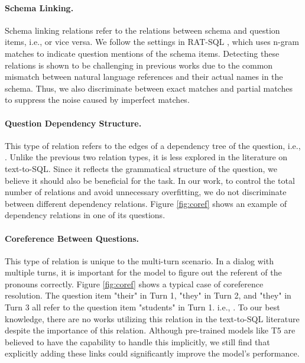 \documentclass[11pt]{article}
\begin{document}
\paragraph{Schema Linking.} Schema linking relations refer to the relations between schema and question items, i.e.,  or vice versa. We follow the settings in RAT-SQL \citep{wang-etal-2020-rat}, which uses n-gram matches to indicate question mentions of the schema items. Detecting these relations is shown to be challenging in previous works \citep{guo-etal-2019-towards,deng-etal-2021-structure} due to the common mismatch between natural language references and their actual names in the schema. Thus, we also discriminate between exact matches and partial matches to suppress the noise caused by imperfect matches.



\paragraph{Question Dependency Structure.} This type of relation refers to the edges of a dependency tree of the question, i.e., . Unlike the previous two relation types, it is less explored in the literature on text-to-SQL. Since it reflects the grammatical structure of the question, we believe it should also be beneficial for the task. In our work, to control the total number of relations and avoid unnecessary overfitting, we do not discriminate between different dependency relations. Figure \ref{fig:coref} shows an example of dependency relations in one of its questions. 

\paragraph{Coreference Between Questions.} This type of relation is unique to the multi-turn scenario. 
In a dialog with multiple turns, it is important for the model to figure out the referent of the pronouns correctly. Figure \ref{fig:coref} shows a typical case of coreference resolution. The question item "their" in Turn 1, "they" in Turn 2, and "they" in Turn 3 all refer to the question item "students" in Turn 1. i.e., . To our best knowledge, there are no works utilizing this relation in the text-to-SQL literature despite the importance of this relation. Although pre-trained models like T5 are believed to have the capability to handle this implicitly, we still find that explicitly adding these links could significantly improve the model's performance.
\end{document}
